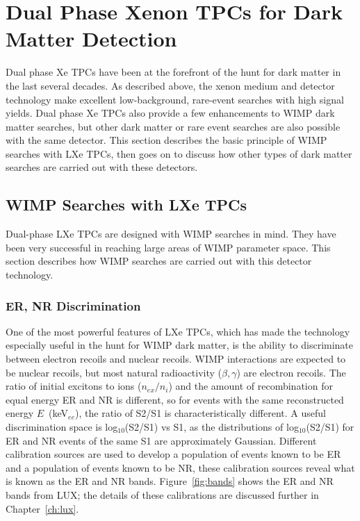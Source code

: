 \section{Dual Phase Xenon TPCs for Dark Matter Detection}
Dual phase Xe \ac{TPC}s have been at the forefront of the hunt for dark matter in the last several decades. As described above, the xenon medium and detector technology make excellent low-background, rare-event searches with high signal yields. Dual phase Xe \ac{TPC}s also provide a few enhancements to \ac{WIMP} dark matter searches, but other dark matter or rare event searches are also possible with the same detector. This section describes the basic principle of \ac{WIMP} searches with \ac{LXe} \ac{TPC}s, then goes on to discuss how other types of dark matter searches are carried out with these detectors.


\subsection{WIMP Searches with LXe TPCs}
Dual-phase \ac{LXe} \ac{TPC}s are designed with \ac{WIMP} searches in mind. They have been very successful in reaching large areas of \ac{WIMP} parameter space. This section describes how \ac{WIMP} searches are carried out with this detector technology.

\subsubsection{ER, NR Discrimination}
\label{sec:er_nr_discrimination}
One of the most powerful features of \ac{LXe} \ac{TPC}s, which has made the technology especially useful in the hunt for \ac{WIMP} dark matter, is the ability to discriminate between electron recoils and nuclear recoils. \ac{WIMP} interactions are expected to be nuclear recoils, but most natural radioactivity ($\beta , \gamma$) are electron recoils. The ratio of initial excitons to ions ($n_{ex}/n_{i}$) and the amount of recombination for equal energy \ac{ER} and \ac{NR} is different, so for events with the same reconstructed energy $E$~(keV$_{ee}$), the ratio of S2/S1 is characteristically different. A useful discrimination space is log$_{10}$(S2/S1) vs S1, as the distributions of log$_{10}$(S2/S1) for \ac{ER} and \ac{NR} events of the same S1  are approximately Gaussian. Different calibration sources are used to develop a population of events known to be \ac{ER} and a population of events known to be \ac{NR}, these calibration sources reveal what is known as the \ac{ER} and \ac{NR} bands. Figure~\ref{fig:bands} shows the \ac{ER} and \ac{NR} bands from \ac{LUX}; the details of these calibrations are discussed further in Chapter~\ref{ch:lux}. 

